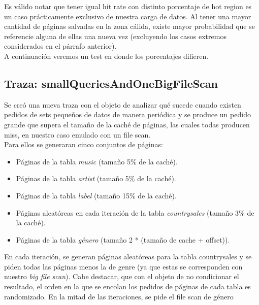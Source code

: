 \documentclass[11pt, a4paper, spanish]{article}
\begin{document}
Es v\'alido notar que tener igual hit rate con distinto porcentaje de hot region es un caso pr\'acticamente exclusivo de nuestra carga de datos.
 Al tener una mayor cantidad de p\'aginas salvadas en la zona c\'alida, existe mayor probabilidad que se referencie alguna de ellas una nueva vez
 (excluyendo los casos extremos considerados en el p\'arrafo anterior).\\

A continuaci\'on veremos un test en donde los porcentajes difieren.\\

\newpage
\subsection{Traza: smallQueriesAndOneBigFileScan}


Se cre\'o una nueva traza con el objeto de analizar qu\'e sucede cuando existen pedidos de sets peque\~{n}os de datos de manera 
peri\'odica y se produce un pedido grande que supera el tama\~{n}o de la cach\'e de p\'aginas, 
las cuales todas producen miss, en nuestro caso emulado con un file scan.\\

Para ellos se generaran cinco conjuntos de p\'aginas:

\begin{itemize}
    \item{P\'aginas de la tabla \textit{music} (tama\~{n}o 5\% de la cach\'e).}
    \item{P\'aginas de la tabla \textit{artist} (tama\~{n}o 5\% de la cach\'e).}
    \item{P\'aginas de la tabla \textit{label} (tama\~{n}o 15\% de la cach\'e).}
    \item{P\'aginas aleat\'oreas en cada iteraci\'on de la tabla \textit{countrysales} (tama\~{n}o 3\% de la cach\'e).}
    \item{P\'aginas de la tabla \textit{g\'enero} (tama\~{n}o 2 * (tama\~{n}o de cache + offset)).}
\end{itemize}

En cada iteraci\'on, se generan p\'aginas aleat\'oreas para la tabla countrysales y se piden todas las p\'aginas menos la de genre
(ya que estas se corresponden con nuestro \textit{big file scan}).
 Cabe destacar, que con el objeto de no condicionar el resultado, el orden en la que se encolan los pedidos 
de p\'aginas de cada tabla es randomizado. 
En la mitad de las iteraciones, se pide el file scan de g\'enero\\
\end{document}
